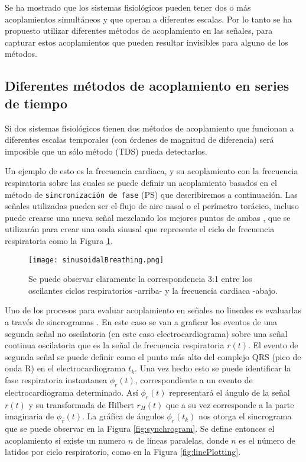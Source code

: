 \documentclass[twoside,twocolumn]{article}
\begin{document}
Se ha mostrado que los sistemas fisiológicos pueden tener dos o más acoplamientos simultáneos y que operan a diferentes escalas.
Por lo tanto se ha propuesto utilizar diferentes métodos de acoplamiento en las señales, para capturar estos acoplamientos que pueden resultar invisibles para alguno de los métodos.

\subsection{Diferentes métodos de acoplamiento en series de tiempo}
Si dos sistemas fisiológicos tienen dos métodos de acoplamiento que funcionan a diferentes escalas temporales (con órdenes de magnitud de diferencia) será imposible que un sólo método (TDS) pueda detectarlos.

Un ejemplo de esto es la frecuencia cardiaca, y su acoplamiento con la frecuencia respiratoria \cite{bartsch2014coexisting} sobre las cuales se puede definir un acoplamiento basados en el método de \texttt{sincronización de fase} (PS) que describiremos a continuación.
Las señales utilizadas pueden ser el flujo de aire nasal o el perímetro torácico, incluso puede crearse una nueva señal mezclando los mejores puntos de ambas \cite{bartsch2014coexisting}, que se utilizarán para crear una onda sinusal que represente el ciclo de frecuencia respiratoria como la Figura \ref{fig:sinusoidalBreathing}.
\begin{figure}[H]
  \texttt{[image: sinusoidalBreathing.png]}
  \caption{Se puede observar claramente la correspondencia 3:1 entre los oscilantes ciclos respiratorios -arriba- y la frecuencia cardiaca -abajo. }
  \label{fig:sinusoidalBreathing}
\end{figure}
Uno de los procesos para evaluar acoplamiento en señales no lineales es evaluarlas a través de sincrogramas \cite{bartsch2014coexisting}.
En este caso se van a graficar los eventos de una segunda señal no oscilatoria (en este caso electrocardiograma) sobre una señal continua oscilatoria que es la señal de frecuencia respiratoria $r(t)$. El evento de segunda señal se puede definir como el punto más alto del complejo QRS (pico de onda R) en el electrocardiograma $t_k$.
Una vez hecho esto se puede identificar la fase respiratoria instantanea $\phi_r(t)$, correspondiente a un evento de electrocardiograma determinado. Así  $\phi_r(t)$ representará el ángulo de la señal $r(t)$ y su transformada de Hilbert $r_H(t)$ que a su vez corresponde a la parte imaginaria de $\phi_r(t)$.
La gráfica de ángulos $\phi_r(t_k)$ nos otorga el sincrograma que se puede observar en la Figura \ref{fig:synchrogram}. Se define entonces el acoplamiento si existe un numero $n$ de líneas paralelas, donde $n$ es el número de latidos por ciclo respiratorio, como en la Figura \ref{fig:linePlotting}.
\end{document}
